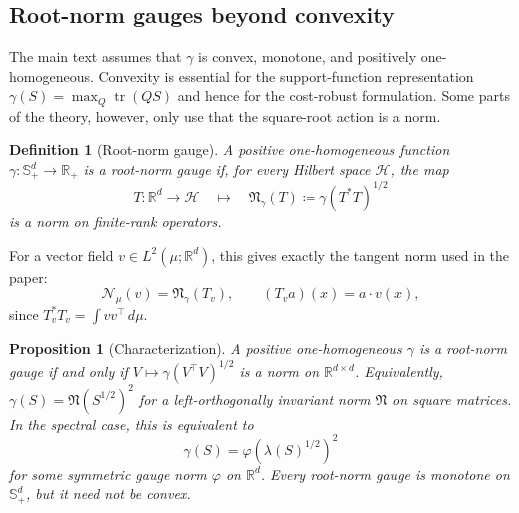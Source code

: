 \documentclass{article}
\newtheorem{proposition}[theorem]{Proposition}
\newtheorem{definition}[theorem]{Definition}
\newcommand{\R}{\mathbb{R}}
\newcommand{\MN}{\mathcal{N}}
\newcommand{\tr}{\operatorname{tr}}
\begin{document}
\subsection{Root-norm gauges beyond convexity}
\label{app:root-norm-gauges}

The main text assumes that $\gamma$ is convex, monotone, and positively
one-homogeneous.  Convexity is essential for the support-function
representation $\gamma(S)=\max_Q\tr(QS)$ and hence for the cost-robust
formulation.  Some parts of the theory, however, only use that the square-root
action is a norm.

\begin{definition}[Root-norm gauge]
\label{def:root-norm-gauge}
A positive one-homogeneous function
$\gamma:\mathbb S_+^d\to\R_+$ is a root-norm gauge if, for every Hilbert space
$\mathcal H$, the map
$$
    T:\R^d\to\mathcal H
    \quad\longmapsto\quad
    \mathfrak N_\gamma(T)\coloneqq \gamma(T^*T)^{1/2}
$$
is a norm on finite-rank operators.
\end{definition}

For a vector field $v\in L^2(\mu;\R^d)$, this gives exactly the tangent norm
used in the paper:
$$
    \MN_\mu(v)=
    \mathfrak N_\gamma(T_v),
    \qquad
    (T_va)(x)=a\cdot v(x),
$$
since $T_v^*T_v=\int vv^\top\,d\mu$.

\begin{proposition}[Characterization]
\label{prop:root-norm-characterization}
A positive one-homogeneous $\gamma$ is a root-norm gauge if and only if
$V\mapsto\gamma(V^\top V)^{1/2}$ is a norm on $\R^{d\times d}$.
Equivalently, $\gamma(S)=\mathfrak N(S^{1/2})^2$ for a left-orthogonally
invariant norm $\mathfrak N$ on square matrices. In the spectral case,
this is equivalent to
$$
    \gamma(S)=\varphi\!\left(\lambda(S)^{1/2}\right)^2
$$
for some symmetric gauge norm $\varphi$ on $\R^d$.  Every root-norm gauge is
monotone on $\mathbb S_+^d$, but it need not be convex.
\end{proposition}
\end{document}

